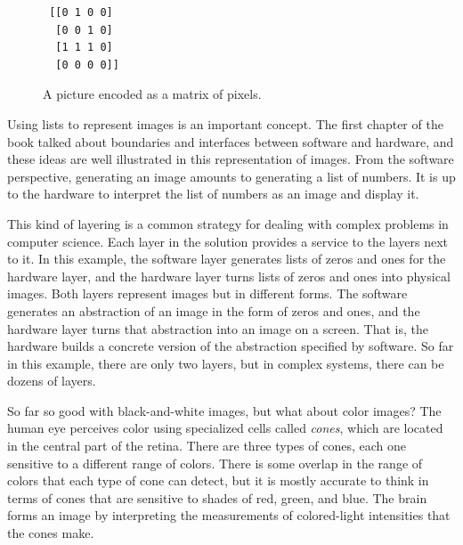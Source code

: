 \begin{figure}
\begin{center}
\begin{minipage}{3cm}
\begin{code}
\begin{verbatim}
 [[0 1 0 0]
  [0 0 1 0]
  [1 1 1 0]
  [0 0 0 0]]
\end{verbatim}
\end{code}
\end{minipage}%
\begin{minipage}{3cm}
\end{minipage}
\end{center}
\caption{A picture encoded as a matrix of pixels.}
\label{fig:glider-in-images}
\end{figure}

Using lists to represent images is an important concept.
The first chapter of the book talked about boundaries
and interfaces between software and hardware, and these ideas are
well illustrated in this representation of images.
From the software perspective,
generating an image amounts to generating a list of numbers.
It is up to the hardware to interpret the list of numbers
as an image and display it.

This kind of layering is a common strategy for dealing
with complex problems in computer science.
Each layer in the solution provides a service
to the layers next to it. In this example,
the software layer generates lists of zeros and ones
for the hardware layer, and
the hardware layer turns lists of zeros and ones into physical images.
Both layers represent images but in different forms.
The software generates an abstraction of an image
in the form of zeros and ones,
and the hardware layer turns that abstraction into an
image on a screen. That is, the hardware builds a
concrete version of the abstraction specified by software.
So far in this example, there are only two layers,
but in complex systems, there can be dozens of layers.

So far so good with black-and-white images,
but what about color images?
The human eye perceives
color using specialized cells called \emph{cones},
which are located in the central
part of the retina. There are three types of cones, each one sensitive
to a different range of colors. There is some overlap in the range
of colors that each type of cone can detect, but it is mostly accurate
to think in terms of cones that are sensitive to shades of red, green,
and blue. The brain forms an image by interpreting
the measurements of colored-light intensities that the cones make.

